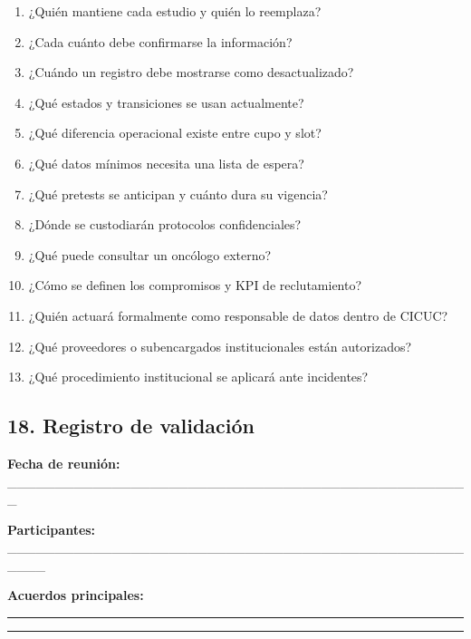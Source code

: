 \documentclass[
]{article}
\providecommand{\tightlist}{%
  \setlength{\itemsep}{0pt}\setlength{\parskip}{0pt}}
\begin{document}
\begin{enumerate}
\def\labelenumi{\arabic{enumi}.}
\tightlist
\item
  ¿Quién mantiene cada estudio y quién lo reemplaza?
\item
  ¿Cada cuánto debe confirmarse la información?
\item
  ¿Cuándo un registro debe mostrarse como desactualizado?
\item
  ¿Qué estados y transiciones se usan actualmente?
\item
  ¿Qué diferencia operacional existe entre cupo y slot?
\item
  ¿Qué datos mínimos necesita una lista de espera?
\item
  ¿Qué pretests se anticipan y cuánto dura su vigencia?
\item
  ¿Dónde se custodiarán protocolos confidenciales?
\item
  ¿Qué puede consultar un oncólogo externo?
\item
  ¿Cómo se definen los compromisos y KPI de reclutamiento?
\item
  ¿Quién actuará formalmente como responsable de datos dentro de CICUC?
\item
  ¿Qué proveedores o subencargados institucionales están autorizados?
\item
  ¿Qué procedimiento institucional se aplicará ante incidentes?
\end{enumerate}

\hypertarget{18-registro-de-validaciuxf3n}{%
\subsection{18. Registro de
validación}\label{18-registro-de-validaciuxf3n}}

\textbf{Fecha de reunión:}
\_\_\_\_\_\_\_\_\_\_\_\_\_\_\_\_\_\_\_\_\_\_\_\_\_\_\_\_\_\_\_\_\_\_\_\_\_\_\_\_\_\_\_\_\_\_\_\_\_

\textbf{Participantes:}
\_\_\_\_\_\_\_\_\_\_\_\_\_\_\_\_\_\_\_\_\_\_\_\_\_\_\_\_\_\_\_\_\_\_\_\_\_\_\_\_\_\_\_\_\_\_\_\_\_\_\_\_

\textbf{Acuerdos principales:}

\begin{center}\rule{0.5\linewidth}{0.5pt}\end{center}

\begin{center}\rule{0.5\linewidth}{0.5pt}\end{center}
\end{document}
